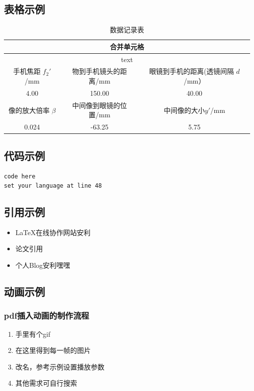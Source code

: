 \documentclass{article}
\begin{document}
\subsection{表格示例}
\begin{table}[H]
  \centering
  \caption{数据记录表}
    \begin{tabular}{|c|c|c|}
    \hline
    \multicolumn{3}{|c|}{合并单元格}\\
    \hline
    \multicolumn{3}{|c|}{text}\\
    \hline
    手机焦距 $f_2'$/mm & 物到手机镜头的距离/mm &眼镜到手机的距离(透镜间隔 $d$/mm）\\
    \hline
    4.00  & 150.00  & 40.00  \\
    \hline
    像的放大倍率 $\beta$ &中间像到眼镜的位置/mm &中间像的大小$y'$/mm\\
    \hline
    0.024  & -63.25 & 5.75 \\
    \hline
    \end{tabular}
\end{table}

\subsection{代码示例}
\begin{lstlisting}
code here
set your language at line 48

\end{lstlisting}

\subsection{引用示例}
\begin{itemize}
 \item  LaTeX在线协作网站安利\cite{overleaf}
 \item  论文引用\cite{six-directional}
 \item  个人Blog安利嘿嘿\cite{myblog}

\end{itemize}

\subsection{动画示例}
\subsubsection{pdf插入动画的制作流程}

\begin{enumerate}
\item 手里有个gif
\item 在这里\cite{iloveimg}得到每一帧的图片
\item 改名，参考示例设置播放参数
\item 其他需求可自行搜索
\end{enumerate}
\end{document}
